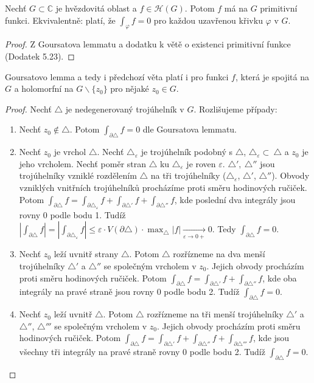 \newpage
\begin{theorem}\label{thm:CaVpHvezdicObl}
Nechť $G \subset \mathbb{C}$ je hvězdovitá oblast a  $f \in \mathcal{H}(G)$. Potom $f$ má na $G$ primitivní funkci. Ekvivalentně: platí, že $\int_\varphi f=0$ pro každou uzavřenou křivku $\varphi$ v $G$.
\end{theorem}

\begin{proof}
Z Goursatova lemmatu a dodatku k větě o existenci primitivní funkce (Dodatek 5.23).
\end{proof}

\begin{note} %
Goursatovo lemma a tedy i předchozí věta platí i pro funkci $f$, která je spojitá na $G$ a holomorfní na $G \backslash \{z_0\}$ pro nějaké $z_0 \in G$.
\end{note}

\begin{proof}
Nechť $\triangle$ je nedegenerovaný trojúhelník v $G$. Rozlišujeme případy:
\begin{enumerate}
    \item Nechť $z_0 \notin \triangle$. Potom $\int_{\partial\triangle}f=0$ dle Goursatova lemmatu.
    \item Nechť $z_0$ je vrchol $\triangle$. Nechť $\triangle_\varepsilon$ je trojúhelník podobný s $\triangle$, $\triangle_\varepsilon\subset\ \triangle$
    a
    $z_{0}$ je jeho
    vrcholem. Nechť poměr stran $\triangle$ ku 
    $\triangle_\varepsilon$ je
    roven $\varepsilon$. $\triangle',\ \triangle''$ jsou trojúhelníky vzniklé rozdělením $\triangle$ na tři trojúhelníky ($\triangle_\varepsilon$, $\triangle'$, $\triangle''$). Obvody vzniklých vnitřních trojúhelníků procházíme proti směru hodinových ručiček.
    Potom $\int_{\partial\triangle}f=\int_{\partial\triangle_\varepsilon}f+\int_{\partial\triangle'}f+\int_{\partial\triangle''}f$, kde poslední dva integrály jsou rovny $0$ podle bodu 1. Tudíž $|\int_{\partial\triangle}f|=|\int_{\partial\triangle_\varepsilon}f| \le \varepsilon \cdot V(\partial\triangle) \cdot \max_\triangle |f| \xrightarrow[\varepsilon \rightarrow 0+]{}0$. Tedy  $\int_{\partial\triangle} f=0$.
    \item Nechť $z_0$ leží uvnitř strany $\triangle$. Potom $\triangle$ rozřízneme na dva menší trojúhelníky $\triangle'$ a $\triangle''$ se společným vrcholem v $z_{0}$. Jejich obvody procházím proti směru hodinových ručiček. Potom $\int_{\partial\triangle}f=\int_{\partial\triangle'}f+\int_{\partial\triangle''}f$, kde oba integrály na pravé straně jsou rovny $0$ podle bodu 2. Tudíž $\int_{\partial\triangle}f=0$.
    \item Nechť $z_0$ leží uvnitř $\triangle$. Potom $\triangle$ rozřízneme na tři menší trojúhelníky $\triangle'$ a $\triangle''$, $\triangle'''$ se společným vrcholem v $z_{0}$. Jejich obvody procházím proti směru hodinových ručiček. Potom $\int_{\partial\triangle}f=\int_{\partial\triangle'}f+\int_{\partial\triangle''}f+\int_{\partial\triangle'''}f$, kde jsou všechny tři integrály na pravé straně rovny $0$ podle bodu 2. Tudíž $\int_{\partial\triangle}f=0$.
\end{enumerate}
\end{proof}


